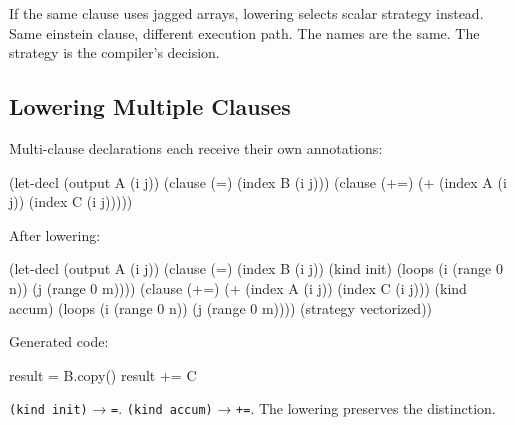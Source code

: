\documentclass[11pt,titlepage]{article}
\newenvironment{Shaded}{}{}
\newcommand{\DecValTok}[1]{\textcolor[rgb]{0.25,0.63,0.44}{#1}}
\newcommand{\NormalTok}[1]{#1}
\newcommand{\OperatorTok}[1]{\textcolor[rgb]{0.40,0.40,0.40}{#1}}
\begin{document}
If the same clause uses jagged arrays, lowering selects scalar strategy
instead. Same einstein clause, different execution path. The names are
the same. The strategy is the compiler's decision.

\vspace{2em}

\hypertarget{lowering-multiple-clauses}{%
\subsection{Lowering Multiple Clauses}\label{lowering-multiple-clauses}}

Multi-clause declarations each receive their own annotations:

\begin{Shaded}
\begin{Highlighting}[]
\NormalTok{(let-decl (output A (i j))}
\NormalTok{  (clause (}\OperatorTok{=}\NormalTok{) (index B (i j)))}
\NormalTok{  (clause (+=) (}\OperatorTok{+}\NormalTok{ (index A (i j)) (index C (i j)))))}
\end{Highlighting}
\end{Shaded}

After lowering:

\begin{Shaded}
\begin{Highlighting}[]
\NormalTok{(let-decl (output A (i j))}
\NormalTok{  (clause (}\OperatorTok{=}\NormalTok{) (index B (i j))}
\NormalTok{    (kind init)}
\NormalTok{    (loops (i (range }\DecValTok{0}\NormalTok{ n)) (j (range }\DecValTok{0}\NormalTok{ m))))}
\NormalTok{  (clause (+=) (}\OperatorTok{+}\NormalTok{ (index A (i j)) (index C (i j)))}
\NormalTok{    (kind accum)}
\NormalTok{    (loops (i (range }\DecValTok{0}\NormalTok{ n)) (j (range }\DecValTok{0}\NormalTok{ m))))}
\NormalTok{  (strategy vectorized))}
\end{Highlighting}
\end{Shaded}

Generated code:

\begin{Shaded}
\begin{Highlighting}[]
\NormalTok{result }\OperatorTok{=}\NormalTok{ B.copy()}
\NormalTok{result }\OperatorTok{+=}\NormalTok{ C}
\end{Highlighting}
\end{Shaded}

\texttt{(kind\ init)} → \texttt{=}. \texttt{(kind\ accum)} →
\texttt{+=}. The lowering preserves the distinction.
\end{document}
